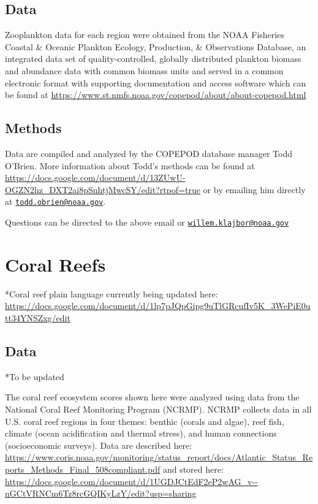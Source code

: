\documentclass[
]{book}
\begin{document}
\hypertarget{data}{%
\section{Data}\label{data}}

Zooplankton data for each region were obtained from the NOAA Fisheries Coastal \& Oceanic Plankton Ecology, Production, \& Observations Database, an integrated data set of quality-controlled, globally distributed plankton biomass and abundance data with common biomass units and served in a common electronic format with supporting documentation and access software which can be found at \url{https://www.st.nmfs.noaa.gov/copepod/about/about-copepod.html}

\hypertarget{methods}{%
\section{Methods}\label{methods}}

Data are compiled and analyzed by the COPEPOD database manager Todd O'Brien. More information about Todd's methods can be found at \url{https://docs.google.com/document/d/13ZUwU-OGZN2hz_DXT2ai8pSnhtjMwcSY/edit?rtpof=true} or by emailing him directly at \href{mailto:todd.obrien@noaa.gov}{\nolinkurl{todd.obrien@noaa.gov}}.

Questions can be directed to the above email or \href{mailto:willem.klajbor@noaa.gov}{\nolinkurl{willem.klajbor@noaa.gov}}

\hypertarget{coral-reefs}{%
\chapter{Coral Reefs}\label{coral-reefs}}

*Coral reef plain language currently being updated here: \url{https://docs.google.com/document/d/1lp7pJQpGipg9uTlGRcufIv5K_3WePiE0utt34YNSZxg/edit}

\hypertarget{data-1}{%
\section{Data}\label{data-1}}

*To be updated

The coral reef ecosystem scores shown here were analyzed using data from the National Coral Reef Monitoring Program (NCRMP). NCRMP collects data in all U.S. coral reef regions in four themes: benthic (corals and algae), reef fish, climate (ocean acidification and thermal stress), and human connections (socioeconomic surveys). Data are described here: \url{https://www.coris.noaa.gov/monitoring/status_report/docs/Atlantic_Status_Reports_Methods_Final_508compliant.pdf} and stored here: \url{https://docs.google.com/document/d/1UGDJCtEdF2eP2wAG_v--nGCtVRNCm6Tz8rcGQIKyLzY/edit?usp=sharing}
\end{document}
